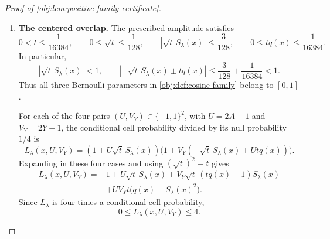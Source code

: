 \begin{proof}[Proof of \cref{obj:lem:positive-family-certificate}]
\begin{enumerate}
For later support counts, define
\[
\mathcal J_x=\{j\in\mathcal J:|x-j\delta_{\mathrm L}|
                                      \le\delta_{\mathrm L}\},
\qquad
\mathcal J_x^\circ=\{j\in\mathcal J:\phi_j(x)\ne0\}.
\]
The closed-support condition places \(j\) between \(j_x-1\) and
\(j_x+1\), while the preceding two-frame argument gives
\[
|\mathcal J_x|\le3,\qquad |\mathcal J_x^\circ|\le2,
\qquad
|F_\lambda(x)|\le\sum_{j\in\mathcal J_x}|\phi_j(x)|\le3,
\qquad |S_\lambda(x)|\le3.
\]

Uniform binary signs are independent, and pairing encodings that differ
in one coordinate gives
\[
E_\lambda\sigma_{\lambda,j}=0,
\qquad
E_\lambda(\sigma_{\lambda,j}\sigma_{\lambda,j'})
=
\begin{cases}
1,&j=j',\\
0,&j\ne j'.
\end{cases}
\]
Expanding the finite frame sum and its square therefore yields
\[
E_\lambda S_\lambda(x)=0,
\qquad
E_\lambda S_\lambda(x)^2
=q(x)\sum_{j\in\mathcal J}\phi_j(x)^2=q(x).
\]

\item \textbf{The centered overlap.}
The prescribed amplitude satisfies
\[
0<t\le\frac1{16384},
\qquad
0\le\sqrt t\le\frac1{128},
\qquad
|\sqrt t\,S_\lambda(x)|\le\frac3{128},
\qquad
0\le tq(x)\le\frac1{16384}.
\]
In particular,
\[
\left|\sqrt t\,S_\lambda(x)\right|<1,
\qquad
\left|-\sqrt t\,S_\lambda(x)\pm tq(x)\right|
\le\frac3{128}+\frac1{16384}<1.
\]
Thus all three Bernoulli parameters in
\cref{obj:def:cosine-family} belong to \([0,1]\).

For each of the four pairs
\((U,V_Y)\in\{-1,1\}^2\), with \(U=2A-1\) and \(V_Y=2Y-1\),
the conditional cell probability divided by its null probability
\(1/4\) is
\[
L_\lambda(x,U,V_Y)
=(1+U\sqrt t\,S_\lambda(x))
 \bigl(1+V_Y(-\sqrt t\,S_\lambda(x)+Utq(x))\bigr).
\]
Expanding in these four cases and using \((\sqrt t)^2=t\) gives
\[
\begin{aligned}
L_\lambda(x,U,V_Y)
={}&1+U\sqrt t\,S_\lambda(x)
 +V_Y\sqrt t\,(tq(x)-1)S_\lambda(x)\\
&+UV_Yt\bigl(q(x)-S_\lambda(x)^2\bigr).
\end{aligned}
\]
Since \(L_\lambda\) is four times a conditional cell probability,
\[
0\le L_\lambda(x,U,V_Y)\le4.
\]


\end{enumerate}
\end{proof}
